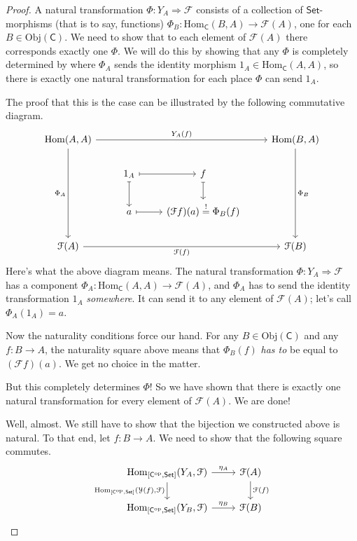 \documentclass[a4paper]{report}
\newcommand{\Obj}{\mathrm{Obj}}
\newcommand{\Hom}{\mathrm{Hom}}
\theoremstyle{definition}
\theoremstyle{plain}
\theoremstyle{remark}
\begin{document}
\begin{proof}
  A natural transformation $\Phi\colon Y_{A} \Rightarrow \mathcal{F}$ consists of a collection of $\mathsf{Set}$-morphisms (that is to say, functions) $\Phi_{B}\colon \Hom_{\mathsf{C}}(B, A) \to \mathcal{F}(A)$, one for each $B \in \Obj(\mathsf{C})$. We need to show that to each element of $\mathcal{F}(A)$ there corresponds exactly one $\Phi$. We will do this by showing that any $\Phi$ is completely determined by where $\Phi_{A}$ sends the identity morphism $1_{A} \in \Hom_{\mathsf{C}}(A, A)$, so there is exactly one natural transformation for each place $\Phi$ can send $1_{A}$.

  The proof that this is the case can be illustrated by the following commutative diagram.
  \begin{equation*}
    \begin{tikzcd}
      \Hom(A, A)
      \arrow[rrr, "Y_{A}(f)"]
      \arrow[ddd, swap, "\Phi_{A}"]
      & & & \Hom(B, A)
      \arrow[ddd, "\Phi_{B}"]
      \\
      & 1_{A}
      \arrow[r, mapsto]
      \arrow[d, mapsto]
      & f
      \arrow[d, mapsto]
      \\
      & a
      \arrow[r, mapsto]
      & (\mathcal{F}f)(a) \stackrel{!}{=} \Phi_{B}(f) 
      \\
      \mathcal{F}(A)
      \arrow[rrr, swap, "\mathcal{F}(f)"]
      & & & \mathcal{F}(B)
    \end{tikzcd}
  \end{equation*}
  Here's what the above diagram means. The natural transformation $\Phi\colon Y_{A} \Rightarrow \mathcal{F}$ has a component $\Phi_{A}\colon \Hom_{\mathsf{C}}(A, A) \to \mathcal{F}(A)$, and $\Phi_{A}$ has to send the identity transformation $1_{A}$ \emph{somewhere}. It can send it to any element of $\mathcal{F}(A)$; let's call $\Phi_{A}(1_{A}) = a$.

  Now the naturality conditions force our hand. For any $B \in \Obj(\mathsf{C})$ and any $f\colon B \to A$, the naturality square above means that $\Phi_{B}(f)$ \emph{has to} be equal to $(\mathcal{F}f)(a)$. We get no choice in the matter.

  But this completely determines $\Phi$! So we have shown that there is exactly one natural transformation for every element of $\mathcal{F}(A)$. We are done!

  Well, almost. We still have to show that the bijection we constructed above is natural. To that end, let $f\colon B \to A$. We need to show that the following square commutes.
  \begin{equation*}
    \begin{tikzcd}
      \Hom_{[\mathsf{C}^{\text{op}}, \mathsf{Set}]}(Y_{A}, \mathcal{F})
      \arrow[r, "\eta_{A}"]
      \arrow[d, swap, "{\Hom_{[\mathsf{C}^{\text{op}}, \mathsf{Set}]}(\mathcal{Y}(f), \mathcal{F})}"]
      & \mathcal{F}(A)
      \arrow[d, "\mathcal{F}(f)"]
      \\
      \Hom_{[\mathsf{C}^{\text{op}}, \mathsf{Set}]}(Y_{B}, \mathcal{F})
      \arrow[r, "\eta_{B}"]
      & \mathcal{F}(B)
    \end{tikzcd}
  \end{equation*}


\end{proof}
\end{document}
